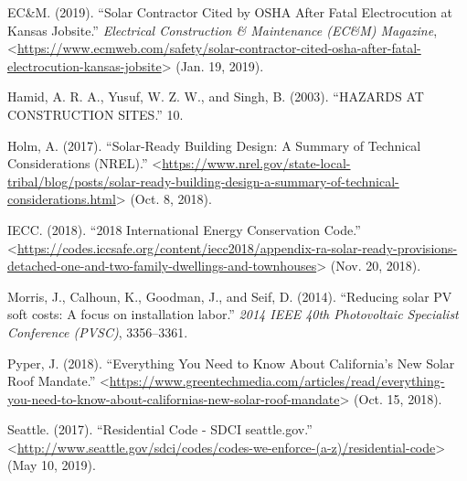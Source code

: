 \documentclass[]{article}
\begin{document}
\leavevmode\hypertarget{ref-ecmSolarContractorCited2019}{}%
EC\&M. (2019). ``Solar Contractor Cited by OSHA After Fatal
Electrocution at Kansas Jobsite.'' \emph{Electrical Construction \&
Maintenance (EC\&M) Magazine},
\textless{}\url{https://www.ecmweb.com/safety/solar-contractor-cited-osha-after-fatal-electrocution-kansas-jobsite}\textgreater{}
(Jan. 19, 2019).

\leavevmode\hypertarget{ref-hamidHAZARDSCONSTRUCTIONSITES2003}{}%
Hamid, A. R. A., Yusuf, W. Z. W., and Singh, B. (2003). ``HAZARDS AT
CONSTRUCTION SITES.'' 10.

\leavevmode\hypertarget{ref-holmSolarReadyBuildingDesign2017}{}%
Holm, A. (2017). ``Solar-Ready Building Design: A Summary of Technical
Considerations (NREL).''
\textless{}\url{https://www.nrel.gov/state-local-tribal/blog/posts/solar-ready-building-design-a-summary-of-technical-considerations.html}\textgreater{}
(Oct. 8, 2018).

\leavevmode\hypertarget{ref-iecc2018InternationalEnergy2018}{}%
IECC. (2018). ``2018 International Energy Conservation Code.''
\textless{}\url{https://codes.iccsafe.org/content/iecc2018/appendix-ra-solar-ready-provisions-detached-one-and-two-family-dwellings-and-townhouses}\textgreater{}
(Nov. 20, 2018).

\leavevmode\hypertarget{ref-morrisReducingSolarPV2014}{}%
Morris, J., Calhoun, K., Goodman, J., and Seif, D. (2014). ``Reducing
solar PV soft costs: A focus on installation labor.'' \emph{2014 IEEE
40th Photovoltaic Specialist Conference (PVSC)}, 3356--3361.

\leavevmode\hypertarget{ref-pyperEverythingYouNeed2018}{}%
Pyper, J. (2018). ``Everything You Need to Know About California's New
Solar Roof Mandate.''
\textless{}\url{https://www.greentechmedia.com/articles/read/everything-you-need-to-know-about-californias-new-solar-roof-mandate}\textgreater{}
(Oct. 15, 2018).

\leavevmode\hypertarget{ref-seattleResidentialCodeSDCI2017}{}%
Seattle. (2017). ``Residential Code - SDCI \textbar{} seattle.gov.''
\textless{}\url{http://www.seattle.gov/sdci/codes/codes-we-enforce-(a-z)/residential-code}\textgreater{}
(May 10, 2019).
\end{document}
